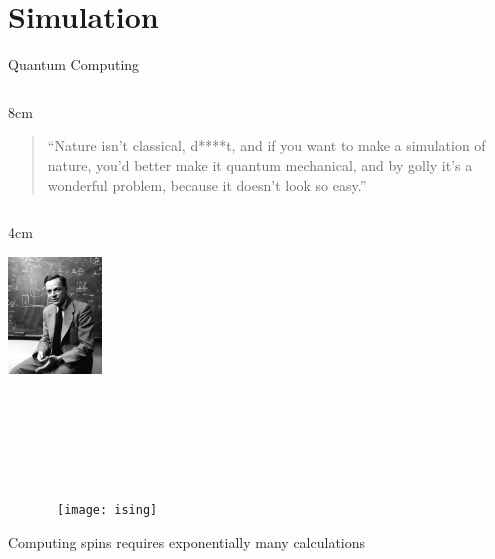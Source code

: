 \section{Simulation}


\newcommand\cols[1]{
\begin{columnsonlytextwidth}
	#1
\end{columnsonlytextwidth}
}
\newcommand\col[2]{
\begin{column}{#1}
	#2
\end{column}
}



\begin{refframe}{Quantum Computing}
\centering

\cols{
	\col{8cm}{
		\begin{quote}
		``Nature isn't classical, d****t, and if you want to make a simulation of nature, you'd better make it quantum mechanical, and by golly it's a wonderful problem, because it doesn't look so easy.''
		\end{quote}
	}
	\col{4cm}{
		\includegraphics[width=2.5cm]{pics/feynman.jpg}
	}
}

~\\
~\\
~\\
~\\
\pause

		~~~~~~~\texttt{[image: ising]}
		
		Computing spins requires exponentially many calculations

\end{refframe}




